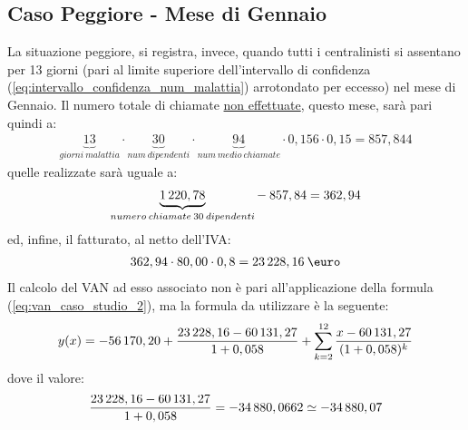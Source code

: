 \subsection[Caso Peggiore - Mese di Gennaio]{Caso Peggiore - Mese di Gennaio}
La situazione peggiore, si registra, invece, quando tutti i centralinisti si assentano per 13 giorni (pari al limite superiore dell'intervallo di confidenza (\ref{eq:intervallo_confidenza_num_malattia}) arrotondato per eccesso) nel mese di Gennaio.
\newline
Il numero totale di chiamate \underline{non effettuate}, questo mese, sarà pari quindi a: 
	\begin{equation}
	\label{eq:totale_chiamate_non_effettuate_gennaio}
	\begin{split}
		\underbrace{13}_{giorni \: malattia} \cdot \underbrace{30}_{num\: dipendenti} \cdot \underbrace{94}_{num \: medio \: chiamate} \cdot 0,156 \cdot 0,15 = 857,844 
 	\end{split}
	\end{equation}
quelle realizzate sarà uguale a:
	\begin{equation}
	\label{eq:totale_chiamate_effettuate_gennaio}
	\begin{split}
		\underbrace{1\thinspace 220,78}_{numero\: chiamate \: 30 \: dipendenti} - \: 857,84 = 362,94
 	\end{split}
	\end{equation}	
ed, infine, il fatturato, al netto dell'IVA:
	\begin{equation}
	\label{eq:fatturato_gennaio}
	\begin{split}
		362,94 \cdot 80,00 \cdot 0,8 = 23\thinspace 228,16 \: \mbox{\euro}
 	\end{split}
	\end{equation}
Il calcolo del VAN ad esso associato non è pari all'applicazione della formula (\ref{eq:van_caso_studio_2}), ma la formula da utilizzare è la seguente:
	\begin{equation}
	\label{eq:van_caso_gennaio}
	\begin{split}
		y(x) = -56\thinspace 170,20 + \frac{23\thinspace 228,16 - 60\thinspace 131,27}{1+0,058} + \sum_{k=2}^{12} \frac{x - 60\thinspace 131,27} {(1+0,058)^{k}}
 	\end{split}
	\end{equation}
dove il valore:
	\begin{equation}
	\label{eq:attualizzazione_gennaio}
	\begin{split}
		\frac{23\thinspace 228,16 - 60\thinspace 131,27}{1+0,058} = -34\thinspace 880,0662 \simeq -34\thinspace 880,07
 	\end{split}
	\end{equation}

